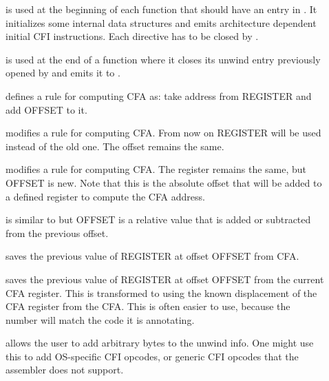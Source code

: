 \begin{description}
\item[] is used at the beginning of each
  function that should have an entry in . It
  initializes some internal data structures and emits architecture
  dependent initial CFI instructions.  Each 
  directive has to be closed by .
  
\item[] is used at the end of a function
  where it closes its unwind entry previously opened by
   and emits it to .

\item[] defines a
  rule for computing CFA as: take address from REGISTER and add OFFSET
  to it.
  
\item[] modifies a
  rule for computing CFA. From now on REGISTER will be used instead of
  the old one. The offset remains the same.
  
\item[] modifies a rule for
  computing CFA. The register remains the same, but OFFSET is new.
  Note that this is the absolute offset that will be added to a defined
  register to compute the CFA address.
  
\item[] is similar to
   but OFFSET is a relative value that is
  added or subtracted from the previous offset.
  
\item[] saves the previous
  value of REGISTER at offset OFFSET from CFA.
  
\item[] saves the
  previous value of REGISTER at offset OFFSET from the current CFA
  register.  This is transformed to  using the
  known displacement of the CFA register from the CFA.  This is often
  easier to use, because the number will match the code it is
  annotating.
  
\item[]  allows the user to
  add arbitrary bytes to the unwind info.  One might use this to add
  OS-specific CFI opcodes, or generic CFI opcodes that the assembler
  does not support.
\end{description}


